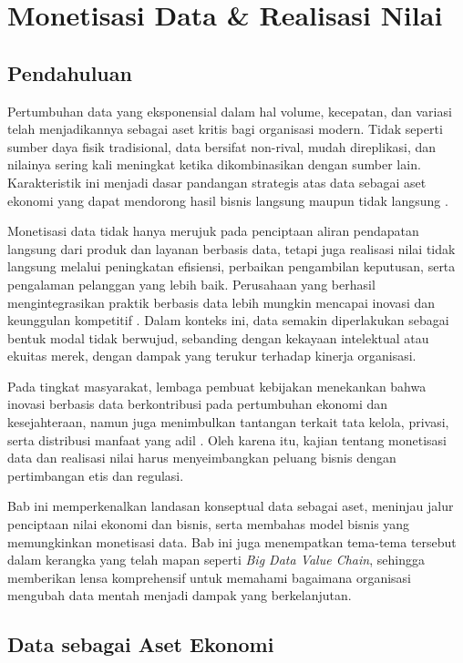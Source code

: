 \chapter{Monetisasi Data \& Realisasi Nilai}

\section{Pendahuluan}

Pertumbuhan data yang eksponensial dalam hal volume, kecepatan, dan variasi telah menjadikannya sebagai aset kritis bagi organisasi modern. Tidak seperti sumber daya fisik tradisional, data bersifat non-rival, mudah direplikasi, dan nilainya sering kali meningkat ketika dikombinasikan dengan sumber lain. Karakteristik ini menjadi dasar pandangan strategis atas data sebagai aset ekonomi yang dapat mendorong hasil bisnis langsung maupun tidak langsung \cite{laney2001, manyika2011bigdata}.

Monetisasi data tidak hanya merujuk pada penciptaan aliran pendapatan langsung dari produk dan layanan berbasis data, tetapi juga realisasi nilai tidak langsung melalui peningkatan efisiensi, perbaikan pengambilan keputusan, serta pengalaman pelanggan yang lebih baik. Perusahaan yang berhasil mengintegrasikan praktik berbasis data lebih mungkin mencapai inovasi dan keunggulan kompetitif \cite{brynjolfsson2016competing, hartmann2016data}. Dalam konteks ini, data semakin diperlakukan sebagai bentuk modal tidak berwujud, sebanding dengan kekayaan intelektual atau ekuitas merek, dengan dampak yang terukur terhadap kinerja organisasi.

Pada tingkat masyarakat, lembaga pembuat kebijakan menekankan bahwa inovasi berbasis data berkontribusi pada pertumbuhan ekonomi dan kesejahteraan, namun juga menimbulkan tantangan terkait tata kelola, privasi, serta distribusi manfaat yang adil \cite{oecd2015}. Oleh karena itu, kajian tentang monetisasi data dan realisasi nilai harus menyeimbangkan peluang bisnis dengan pertimbangan etis dan regulasi.

Bab ini memperkenalkan landasan konseptual data sebagai aset, meninjau jalur penciptaan nilai ekonomi dan bisnis, serta membahas model bisnis yang memungkinkan monetisasi data. Bab ini juga menempatkan tema-tema tersebut dalam kerangka yang telah mapan seperti \textit{Big Data Value Chain}, sehingga memberikan lensa komprehensif untuk memahami bagaimana organisasi mengubah data mentah menjadi dampak yang berkelanjutan.


\section{Data sebagai Aset Ekonomi}

